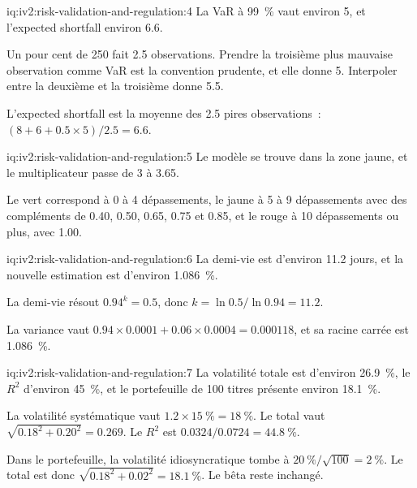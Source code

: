 \begin{solution}{iq:iv2:risk-validation-and-regulation:4}
La VaR à 99~\% vaut environ 5, et l'expected shortfall environ 6.6.

Un pour cent de 250 fait 2.5 observations. Prendre la troisième plus mauvaise observation comme VaR est la convention prudente, et elle donne 5. Interpoler entre la deuxième et la troisième donne 5.5.

L'expected shortfall est la moyenne des 2.5 pires observations~: $(8 + 6 + 0.5 \times 5)/2.5 = 6.6$.

\end{solution}

\begin{solution}{iq:iv2:risk-validation-and-regulation:5}
Le modèle se trouve dans la zone jaune, et le multiplicateur passe de 3 à 3.65.

Le vert correspond à 0 à 4 dépassements, le jaune à 5 à 9 dépassements avec des compléments de 0.40, 0.50, 0.65, 0.75 et 0.85, et le rouge à 10 dépassements ou plus, avec 1.00.

\end{solution}

\begin{solution}{iq:iv2:risk-validation-and-regulation:6}
La demi-vie est d'environ 11.2 jours, et la nouvelle estimation est d'environ 1.086~\%.

La demi-vie résout $0.94^k = 0.5$, donc $k = \ln 0.5/\ln 0.94 = 11.2$.

La variance vaut $0.94 \times 0.0001 + 0.06 \times 0.0004 = 0.000118$, et sa racine carrée est 1.086~\%.

\end{solution}

\begin{solution}{iq:iv2:risk-validation-and-regulation:7}
La volatilité totale est d'environ 26.9~\%, le $R^2$ d'environ 45~\%, et le portefeuille de 100 titres présente environ 18.1~\%.

La volatilité systématique vaut $1.2 \times 15~\% = 18~\%$. Le total vaut $\sqrt{0.18^2 + 0.20^2} = 0.269$. Le $R^2$ est $0.0324/0.0724 = 44.8~\%$.

Dans le portefeuille, la volatilité idiosyncratique tombe à $20~\%/\sqrt{100} = 2~\%$. Le total est donc $\sqrt{0.18^2 + 0.02^2} = 18.1~\%$. Le bêta reste inchangé.

\end{solution}

